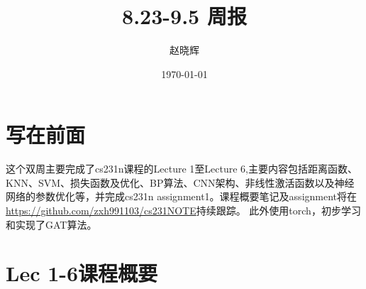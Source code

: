 \documentclass[a4paper]{article}
\title{8.23-9.5 周报}
\author{赵晓辉}
\date{\today}
\begin{document}
\maketitle

\section{写在前面}

这个双周主要完成了cs231n课程的Lecture 1至Lecture 6,主要内容包括距离函数、KNN、SVM、损失函数及优化、BP算法、CNN架构、非线性激活函数以及神经网络的参数优化等，并完成cs231n assignment1。课程概要笔记及assignment将在\url{https://github.com/zxh991103/cs231NOTE}持续跟踪。
此外使用torch，初步学习和实现了GAT算法。




\section{Lec 1-6课程概要}
\end{document}
